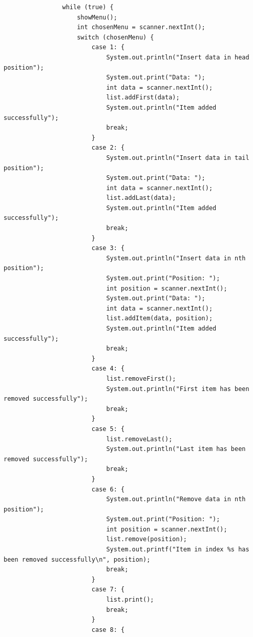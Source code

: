 \documentclass[12pt,titlepage]{article}
\begin{document}
\begin{enumerate}
{\begin{verbatim}
                while (true) {
                    showMenu();
                    int chosenMenu = scanner.nextInt();
                    switch (chosenMenu) {
                        case 1: {
                            System.out.println("Insert data in head position");
                            System.out.print("Data: ");
                            int data = scanner.nextInt();
                            list.addFirst(data);
                            System.out.println("Item added successfully");
                            break;
                        }
                        case 2: {
                            System.out.println("Insert data in tail position");
                            System.out.print("Data: ");
                            int data = scanner.nextInt();
                            list.addLast(data);
                            System.out.println("Item added successfully");
                            break;
                        }
                        case 3: {
                            System.out.println("Insert data in nth position");
                            System.out.print("Position: ");
                            int position = scanner.nextInt();
                            System.out.print("Data: ");
                            int data = scanner.nextInt();
                            list.addItem(data, position);
                            System.out.println("Item added successfully");
                            break;
                        }
                        case 4: {
                            list.removeFirst();
                            System.out.println("First item has been removed successfully");
                            break;
                        }
                        case 5: {
                            list.removeLast();
                            System.out.println("Last item has been removed successfully");
                            break;
                        }
                        case 6: {
                            System.out.println("Remove data in nth position");
                            System.out.print("Position: ");
                            int position = scanner.nextInt();
                            list.remove(position);
                            System.out.printf("Item in index %s has been removed successfully\n", position);
                            break;
                        }
                        case 7: {
                            list.print();
                            break;
                        }
                        case 8: {

\end{verbatim}}
\end{enumerate}
\end{document}
